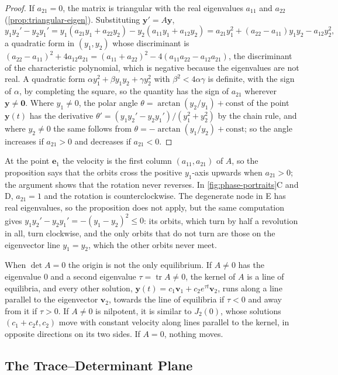 \begin{proof}
If $a_{21}=0$, the matrix is triangular with the real eigenvalues $a_{11}$ and $a_{22}$ (\cref{prop:triangular-eigen}). Substituting $\mathbf y'=A\mathbf y$,
\[
y_1y_2'-y_2y_1'=y_1(a_{21}y_1+a_{22}y_2)-y_2(a_{11}y_1+a_{12}y_2)=a_{21}y_1^2+(a_{22}-a_{11})y_1y_2-a_{12}y_2^2 ,
\]
a quadratic form in $(y_1,y_2)$ whose discriminant is $(a_{22}-a_{11})^2+4a_{12}a_{21}=(a_{11}+a_{22})^2-4(a_{11}a_{22}-a_{12}a_{21})$, the discriminant of the characteristic polynomial, which is negative because the eigenvalues are not real. A quadratic form $\alpha y_1^2+\beta y_1y_2+\gamma y_2^2$ with $\beta^2<4\alpha\gamma$ is definite, with the sign of $\alpha$, by completing the square, so the quantity has the sign of $a_{21}$ wherever $\mathbf y\ne\mathbf 0$. Where $y_1\ne0$, the polar angle $\theta=\arctan(y_2/y_1)+\text{const}$ of the point $\mathbf y(t)$ has the derivative $\theta'=(y_1y_2'-y_2y_1')/(y_1^2+y_2^2)$ by the chain rule, and where $y_2\ne0$ the same follows from $\theta=-\arctan(y_1/y_2)+\text{const}$; so the angle increases if $a_{21}>0$ and decreases if $a_{21}<0$.
\end{proof}

At the point $\mathbf e_1$ the velocity is the first column $(a_{11},a_{21})$ of $A$, so the proposition says that the orbits cross the positive $y_1$-axis upwards when $a_{21}>0$; the argument shows that the rotation never reverses. In \cref{fig:phase-portraits}C and D, $a_{21}=1$ and the rotation is counterclockwise. The degenerate node in E has real eigenvalues, so the proposition does not apply, but the same computation gives $y_1y_2'-y_2y_1'=-(y_1-y_2)^2\le0$: its orbits, which turn by half a revolution in all, turn clockwise, and the only orbits that do not turn are those on the eigenvector line $y_1=y_2$, which the other orbits never meet.

When $\det A=0$ the origin is not the only equilibrium. If $A\ne0$ has the eigenvalue $0$ and a second eigenvalue $\tau=\operatorname{tr}A\ne0$, the kernel of $A$ is a line of equilibria, and every other solution, $\mathbf y(t)=c_1\mathbf v_1+c_2e^{\tau t}\mathbf v_2$, runs along a line parallel to the eigenvector $\mathbf v_2$, towards the line of equilibria if $\tau<0$ and away from it if $\tau>0$. If $A\ne0$ is nilpotent, it is similar to $J_2(0)$, whose solutions $(c_1+c_2t,c_2)$ move with constant velocity along lines parallel to the kernel, in opposite directions on its two sides. If $A=0$, nothing moves.

\subsection{The Trace--Determinant Plane}

